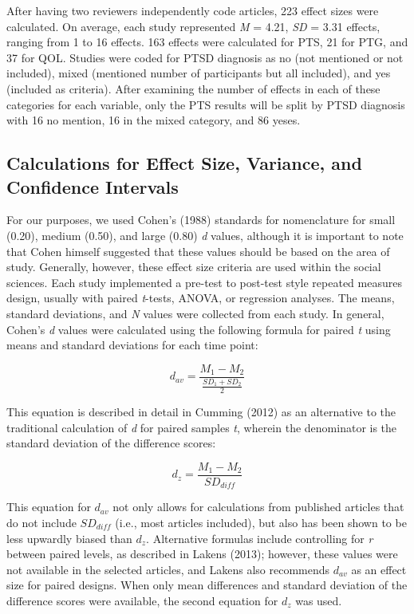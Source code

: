 \documentclass[man, mask]{apa6}
\theoremstyle{definition}
\theoremstyle{definition}
\theoremstyle{definition}
\theoremstyle{remark}
\begin{document}
After having two reviewers independently code articles, 223 effect sizes
were calculated. On average, each study represented \emph{M} = 4.21,
\emph{SD} = 3.31 effects, ranging from 1 to 16 effects. 163 effects were
calculated for PTS, 21 for PTG, and 37 for QOL. Studies were coded for
PTSD diagnosis as no (not mentioned or not included), mixed (mentioned
number of participants but all included), and yes (included as
criteria). After examining the number of effects in each of these
categories for each variable, only the PTS results will be split by PTSD
diagnosis with 16 no mention, 16 in the mixed category, and 86 yeses.

\subsection{Calculations for Effect Size, Variance, and Confidence
Intervals}\label{calculations-for-effect-size-variance-and-confidence-intervals}

For our purposes, we used Cohen's (1988) standards for nomenclature for
small (0.20), medium (0.50), and large (0.80) \emph{d} values, although
it is important to note that Cohen himself suggested that these values
should be based on the area of study. Generally, however, these effect
size criteria are used within the social sciences. Each study
implemented a pre-test to post-test style repeated measures design,
usually with paired \emph{t}-tests, ANOVA, or regression analyses. The
means, standard deviations, and \emph{N} values were collected from each
study. In general, Cohen's \emph{d} values were calculated using the
following formula for paired \emph{t} using means and standard
deviations for each time point:

\[
{d_{av}} = \frac { M_1 - M_2 } { \frac { SD_1 + SD_2 } { 2 }}
\]

This equation is described in detail in Cumming (2012) as an alternative
to the traditional calculation of \emph{d} for paired samples \emph{t},
wherein the denominator is the standard deviation of the difference
scores:

\[
{d_{z}} = \frac { M_1 - M_2 } { SD_{diff} }
\]

This equation for \(d_{av}\) not only allows for calculations from
published articles that do not include \(SD_{diff}\) (i.e., most
articles included), but also has been shown to be less upwardly biased
than \(d_{z}\). Alternative formulas include controlling for \emph{r}
between paired levels, as described in Lakens (2013); however, these
values were not available in the selected articles, and Lakens also
recommends \(d_{av}\) as an effect size for paired designs. When only
mean differences and standard deviation of the difference scores were
available, the second equation for \(d_z\) was used.
\end{document}
